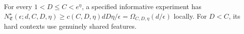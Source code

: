 For every \(1<D\le C<e^\eta\), a specified informative experiment has \(N^\star_{\mathfrak E}(\epsilon;d,C,D,\eta)\ge c(C,D,\eta)dD\eta/\epsilon=\Omega_{C,D,\eta}(d/\epsilon)\) locally. For \(D<C\), its hard contexts use genuinely shared features.